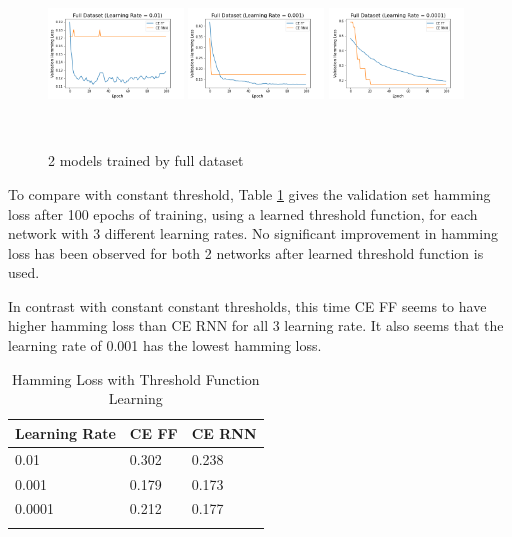 \documentclass[11pt]{article}
\begin{document}
\begin{figure}[!htbp]
\centering 
        \includegraphics[width=0.32\textwidth,height=4.2cm]{Full_Dataset_Learning_Rate_01.png}
        \includegraphics[width=0.32\textwidth,height=4.2cm]{Full_Dataset_Learning_Rate_001.png}
        \includegraphics[width=0.32\textwidth,height=4.2cm]{Full_Dataset_Learning_Rate_0001.png}        
\caption[Original image and post processed image]{2 models trained by full dataset}
\label{fig:example1} 
\end{figure}

To compare with constant threshold, Table \ref{PVFTD} gives the validation set hamming loss after 100 epochs of training, using a learned threshold function, for each network with 3 different learning rates. No significant improvement in hamming loss has been observed for both 2 networks after learned threshold function is used.

In contrast with constant constant thresholds, this time CE FF seems to have higher hamming loss than CE RNN for all 3 learning rate. It also seems that the learning rate of 0.001 has the lowest hamming loss.

 \begin{longtable}[c]{| p{} | p{} |p{} |}
\hline
        Learning Rate  & CE FF & CE RNN  \\
        \hline
         0.01 & 0.302 & 0.238 \\
        \hline
         0.001 & 0.179 & 0.173 \\
        \hline
         0.0001 & 0.212 & 0.177 \\
        \hline        
\caption{Hamming Loss with Threshold Function Learning}
\label{PVFTD}
\end{longtable}
\end{document}
